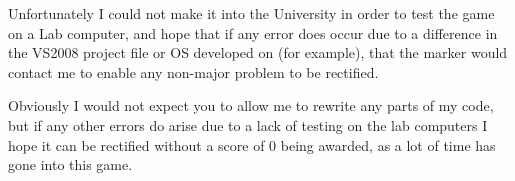 Unfortunately I could not make it into the University in order to test the game on a Lab computer, and hope that if any error does occur due to a difference in the VS2008 project file or OS developed on (for example), that the marker would contact me to enable any non-major problem to be rectified.

Obviously I would not expect you to allow me to rewrite any parts of my code, but if any other errors do arise due to a lack of testing on the lab computers I hope it can be rectified without a score of 0 being awarded, as a lot of time has gone into this game.
